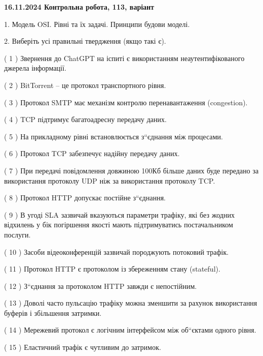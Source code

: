 \documentclass[12pt, ukrainian]{article}
\begin{document}
\vspace{4mm}
\newpage
\begin {large}

\textbf{16.11.2024 Контрольна робота, 113, варіант  }\par


{
1. Модель OSI. Рівні та їх задачі. Принципи будови моделі.



\vspace{5mm}
2. Виберіть усі правильні твердження (якщо такі є).\par
\vspace{2mm}

( 1 ) Звернення до ChatGPT на іспиті є використанням неаутентифікованого джерела інформації.

( 2 ) BitTorrent – це протокол транспортного рівня.

( 3 ) Протокол SMTP має механізм контролю перенавантаження (congestion).

( 4 ) TCP підтримує багатоадресну передачу даних.

( 5 ) На прикладному рівні встановлюється з“єднання між процесами.

( 6 ) Протокол TCP забезпечує надійну передачу даних.

( 7 ) При передачі повідомлення довжиною 100Кб більше даних буде передано за використання протоколу UDP ніж за використання протоколу TCP.

( 8 ) Протокол  HTTP допускає постійне з“єднання.

( 9 ) В угоді SLA зазвичай вказуються параметри трафіку, які без жодних відхилень у бік погіршення якості мають підтримуватись постачальником послуги.

( 10 ) Засоби відеоконференцій зазвичай породжують потоковий трафік.

( 11 ) Протокол  HTTP є протоколом із збереженням стану (stateful).

( 12 ) З“єднання за протоколом  HTTP завжди є непостійним.

( 13 ) Доволі часто пульсацію трафіку можна зменшити за рахунок використання буферів і збільшення затримки.

( 14 ) Мережевий протокол є логічним інтерфейсом між об“єктами одного рівня.

( 15 ) Еластичний трафік є чутливим до затримок.
}
\end {large}
\end{document}
